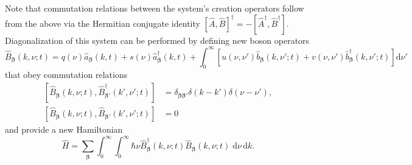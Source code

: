 Note that commutation relations between the system's creation operators follow from the above via the Hermitian conjugate identity $[\hat{A},\hat{B}]^\dagger = -[\hat{A}^\dagger,\hat{B}^\dagger]$. Diagonalization of this system can be performed by defining new boson operators
\begin{equation}
\hat{B}_{\bm{\beta}}(k,\nu;t) = q(\nu)\hat{a}_{\bm{\beta}}(k,t) + s(\nu)\hat{a}_{\bm{\beta}}^\dagger(k,t) + \int_0^\infty\left[u(\nu,\nu')\hat{b}_{\bm{\beta}}(k,\nu';t) + v(\nu,\nu')\hat{b}_{\bm{\beta}}^\dagger(k,\nu';t)\right]\mathrm{d}\nu'
\end{equation}
that obey commutation relations
\begin{equation}
\begin{split}
\left[\hat{B}_{\bm{\beta}}(k,\nu;t),\hat{B}_{\bm{\beta}'}^\dagger(k',\nu';t)\right] &= \delta_{\bm{\beta}\bm{\beta}'}\delta(k - k')\delta(\nu - \nu'),\\
\left[\hat{B}_{\bm{\beta}}(k,\nu;t),\hat{B}_{\bm{\beta}'}(k',\nu';t)\right] &= 0
\end{split}
\end{equation}
and provide a new Hamiltonian
\begin{equation}
\hat{H} = \sum_{\bm{\beta}}\int_0^\infty\int_0^\infty\hbar\nu\hat{B}_{\bm{\beta}}^\dagger(k,\nu;t)\hat{B}_{\bm{\beta}}(k,\nu;t)\;\mathrm{d}\nu\,\mathrm{d}k.
\end{equation}

